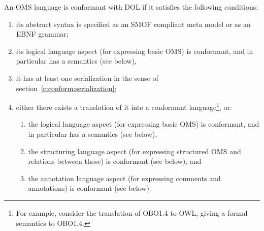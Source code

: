 \documentclass[10pt,%
\ifpretendfinal
final%
\else
draft%
\fi,
]{scrreprt}
\makeatletter
\newcommand*\CommentAuthor{}
\renewcommand*\CommentAuthor{#1}}
\newcommand*\CommentDate{}
\renewcommand*\CommentDate{#1}}
\newcommand*\CommentId{}
\renewcommand*\CommentId{#1}}
\newcommand*\CommentType{}
\renewcommand*\CommentType{#1}}
\newcommand*{\SetCommentColorByType}[1]{%
\edef\localType{{#1}}%
\expandafter\ifstrequal\localType{q-aut}{\colorlet{CommentColor}{red}}{%
\expandafter\ifstrequal\localType{q-all}{\colorlet{CommentColor}{orange}}{%
\expandafter\ifstrequal\localType{todo}{\colorlet{CommentColor}{orange}}{%
\expandafter\ifstrequal\localType{fyi}{\colorlet{CommentColor}{lightgray}}{%
\colorlet{CommentColor}{yellow}}}}}}
\newcommand*{\SetCommentPrefixByType}[1]{%
\edef\localType{{#1}}%
\expandafter\@ifmtarg\localType{%
\edef\CommentPrefix{}%
}{%
\caseupper[q]{#1}%
\edef\CommentPrefix{\thestring: }%
}}
\newcommand*{\initComment}[1]{%
\setkeys{Comment}{#1}%
\SetCommentColorByType{\CommentType}%
\relax%
\SetCommentPrefixByType{\CommentType}%
\relax%
}
\newcommand*{\todonote}[2][]{%
\initComment{#1}%
\pdfcomment[author=\CommentAuthor,color=CommentColor,date=\CommentDate,id=\CommentId]{%
\CommentPrefix
#2}}
\renewcommand*{\todonote}[2][]{%
\initComment{#1}%
\ednote{\CommentPrefix #2}}
\makeatother
\begin{document}
%
%

An OMS language is conformant with DOL if it satisfies the following conditions:
\begin{enumerate}
\item its abstract syntax is specified as an SMOF compliant meta model
or as an EBNF grammar;
\item its logical language aspect (for expressing basic OMS) is conformant,
 and in particular has a semantics (see below),
\item it has at least one serialization in the sense of section~\ref{c:conform:serialization};
\item either there exists a translation of it into a conformant
  language\footnote {For example, consider the translation of OBO1.4
    to OWL, giving a formal semantics to OBO1.4.}, or:
\begin{enumerate}
\item the logical language aspect (for expressing basic OMS) is conformant, and in particular has a semantics (see below),
\item  the
structuring language aspect (for expressing structured OMS and relations
between those) is conformant (see below), and
\item the annotation language aspect (for expressing comments and annotations)
is conformant (see below).
\end{enumerate}
\end{enumerate}
\end{document}
